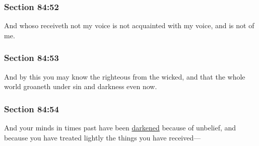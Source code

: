 	\subsubsection{Section 84:52} %
		\label{DC84-52}

		And whoso receiveth not my voice is not acquainted with my voice, and is not of me.


	\subsubsection{Section 84:53} %
		\label{DC84-53}

		And by this you may know the righteous from the wicked, and that the whole world groaneth under sin and darkness even now.


	\subsubsection{Section 84:54} %
		\label{DC84-54}

		And your minds in times past have been \hyperref[DARKNESS-1828]{darkened} because of unbelief, and because you have treated lightly the things you have received---


